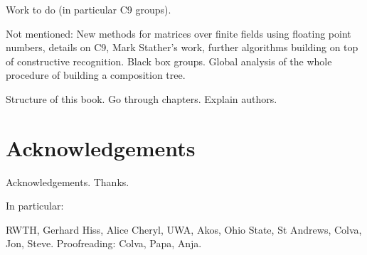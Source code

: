 Work to do (in particular C9 groups).

Not mentioned: New methods for matrices over finite fields using
floating point numbers, details on C9, Mark Stather's work, further
algorithms building on top of constructive recognition. Black box
groups. Global analysis of the whole procedure of building a
composition tree.

Structure of this book. Go through chapters. Explain authors.

\section{Acknowledgements}

Acknowledgements. Thanks.

In particular:

RWTH, Gerhard Hiss, Alice Cheryl, UWA, Akos, Ohio State, St Andrews, Colva, Jon,
Steve. Proofreading: Colva, Papa, Anja.

\renewcommand{\thechapter}{\Roman{chapter}}
